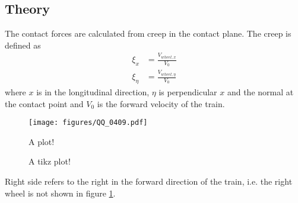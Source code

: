 
\subsection{Theory}
The contact forces are calculated from creep in the contact plane.
The creep is defined as 
\begin{align}
 \xi_x    &= \frac{V_{wheel,x}}{V_0}\\
 \xi_\eta &= \frac{V_{wheel,\eta}}{V_0}
\end{align}
where $x$ is in the longitudinal direction, $\eta$ is perpendicular $x$ and the normal at the contact point and $V_0$ is the forward velocity of the train.

\begin{figure}[htpb!]
 \centering
  \texttt{[image: figures/QQ\_0409.pdf]}
 \caption{A plot!}
 \label{fig:plot} %
\end{figure}

\begin{figure}[htpb!]
\centering
 \caption{A tikz plot!}
 \label{fig:tikz_plot}
\end{figure}

Right side refers to the right in the forward direction of the train, i.e. the right wheel is not shown in figure \ref{fig:plot}.

